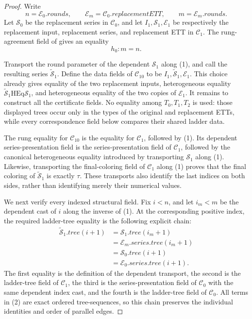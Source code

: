 \begin{proof}
Write
\[
 n=\mathcal E_0.\mathit{rounds},\qquad
 \mathcal E_m=\mathcal C_0.\mathit{replacementETT},\qquad
 m=\mathcal E_m.\mathit{rounds}.
\]
Let \(\mathcal S_0\) be the replacement series in \(\mathcal C_0\), and
let \(I_1,\mathcal S_1,\mathcal E_1\) be respectively the replacement
input, replacement series, and replacement ETT in \(\mathcal C_1\).
The rung-agreement field of
 gives an equality
\[
                         h_0:m=n.                              \tag{1}
\]

Transport the round parameter of the dependent
 \(\mathcal S_1\) along (1), and call the resulting
series \(\widetilde{\mathcal S}_1\).  Define the data fields of
\(\mathcal C_{10}\) to be \(I_1,\widetilde{\mathcal S}_1,\mathcal E_1\).
This choice already gives equality of the two replacement inputs,
heterogeneous equality
\(\widetilde{\mathcal S}_1\mathrel{\mathrm{HEq}}\mathcal S_1\), and
heterogeneous equality of the two copies of \(\mathcal E_1\).  It remains
to construct all the certificate fields.  No equality among
\(T_0,T_1,T_2\) is used: those displayed trees occur only in the types of
the original and replacement ETTs, while every correspondence field below
compares their shared ladder data.

The rung equality for \(\mathcal C_{10}\) is the equality for
\(\mathcal C_1\), followed by (1).  Its dependent series-presentation
field is the series-presentation field of \(\mathcal C_1\), followed by
the canonical heterogeneous equality introduced by transporting
\(\mathcal S_1\) along (1).  Likewise, transporting the final-coloring
field of \(\mathcal C_1\) along (1) proves that the final coloring of
\(\widetilde{\mathcal S}_1\) is exactly \(\tau\).  These transports also
identify the last indices on both sides, rather than identifying merely
their numerical values.

We next verify every indexed structural field.  Fix \(i<n\), and let
\(i_m<m\) be the dependent cast of \(i\) along the inverse of (1).  At
the corresponding positive index, the required ladder-tree equality is
the following explicit chain:
\[
\begin{split}
 \widetilde{\mathcal S}_1.\mathit{tree}(i+1)
 &=\mathcal S_1.\mathit{tree}(i_m+1)\\
 &=\mathcal E_m.\mathit{series}.\mathit{tree}(i_m+1)\\
 &=\mathcal S_0.\mathit{tree}(i+1)\\
 &=\mathcal E_0.\mathit{series}.\mathit{tree}(i+1).
\end{split}                                                    \tag{2}
\]
The first equality is the definition of the dependent transport, the
second is the ladder-tree field of \(\mathcal C_1\), the third is the
series-presentation field of \(\mathcal C_0\) with the same dependent
index cast, and the fourth is the ladder-tree field of \(\mathcal C_0\).
All terms in (2) are exact ordered tree-sequences, so this chain preserves
the individual identities and order of parallel edges.


\end{proof}
